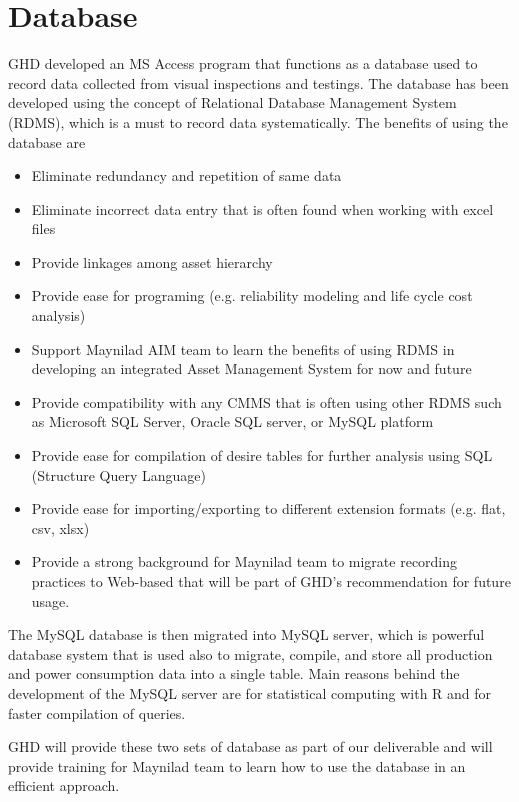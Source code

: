 \section{Database}
\label{24}
GHD developed an MS Access program that functions as a database used to record data collected from visual inspections and testings. The database has been developed using the concept of Relational Database Management System (RDMS), which is a must to record data systematically. The benefits of using the database are

\begin{itemize}
	\item Eliminate redundancy and repetition of same data
	\item Eliminate incorrect data entry that is often found when working with excel files
	\item Provide linkages among asset hierarchy
	\item Provide ease for programing (e.g. reliability modeling and life cycle cost analysis)
	\item Support Maynilad AIM team to learn the benefits of using RDMS in developing an integrated Asset Management System for now and future
	\item Provide compatibility with any CMMS that is often using other RDMS such as Microsoft SQL Server, Oracle SQL server, or MySQL platform
	\item Provide ease for compilation of desire tables for further analysis using SQL (Structure Query Language)
	\item Provide ease for importing/exporting to different extension formats (e.g. flat, csv, xlsx)
	\item Provide a strong background for Maynilad team to migrate recording practices to Web-based that will be part of GHD's recommendation for future usage.
\end{itemize}

The MySQL database is then migrated into MySQL server, which is powerful database system that is used also to migrate, compile, and store all production and power consumption data into a single table. Main reasons behind the development of the MySQL server are for statistical computing with R and for faster compilation of queries.

GHD will provide these two sets of database as part of our deliverable and will provide training for Maynilad team to learn how to use the database in an efficient approach.




